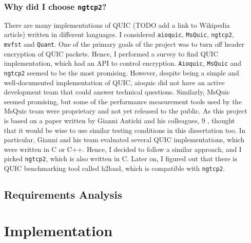 \documentclass[12pt,a4paper,twoside,openright]{report}
\begin{document}
\subsection{Why did I choose  \texttt{ngtcp2}?}
There are many implementations of QUIC (TODO add a link to Wikipedia article) written in different languages.
I considered  \texttt{aioquic},  \texttt{MsQuic},  \texttt{ngtcp2},  \texttt{mvfst} and \texttt{Quant}.
One of the primary goals of the project was to turn off header encryption of QUIC packets.
Hence, I performed a survey to find QUIC implementation, which had an API to control encryption. 
\texttt{Aioquic}, \texttt{MsQuic} and \texttt{ngtcp2} seemed to be the most promising.
However, despite being a simple and well-documented implementation of QUIC, aioquic did not have an active development team that could answer technical questions.
Similarly, MsQuic seemed promising, but some of the performance measurement tools used by the MsQuic team were proprietary and not yet released to the public.
As this project is based on a paper written by Gianni Antichi and his colleagues, 9 \cite{Making_QUIC_Quicker}, thought that it would be wise to use similar testing conditions in this dissertation too.
In particular, Gianni and his team evaluated several QUIC implementations, which were written in C or C++.
Hence, I decided to follow a similar approach, and I picked \texttt{ngtcp2}, which is also written in C.
Later on, I figured out that there is QUIC benchmarking tool called h2load, which is compatible with \texttt{ngtcp2}.


\section{Requirements Analysis}




\chapter{Implementation}

\end{document}
